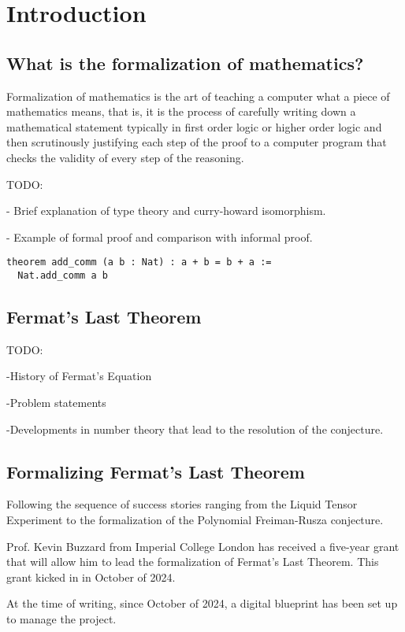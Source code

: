 \chapter{Introduction}\label{Ch1_Introduction}

\section{What is the formalization of mathematics?}

Formalization of mathematics is the art of teaching a computer what a piece of mathematics means, that is, it is the process of carefully writing down a mathematical statement typically in first order logic or higher order logic and then scrutinously justifying each step of the proof to a computer program that checks the validity of every step of the reasoning. 

TODO:

- Brief explanation of type theory and curry-howard isomorphism.

- Example of formal proof and comparison with informal proof.


\begin{verbatim}
theorem add_comm (a b : Nat) : a + b = b + a :=
  Nat.add_comm a b
\end{verbatim}


\section{Fermat's Last Theorem}

TODO:

-History of Fermat's Equation

-Problem statements

-Developments in number theory that lead to the resolution of the conjecture.


\section{Formalizing Fermat's Last Theorem}

Following the sequence of success stories ranging from the Liquid Tensor Experiment to the formalization of the Polynomial Freiman-Rusza conjecture. 

Prof. Kevin Buzzard from Imperial College London has received a five-year grant that will allow him to lead the formalization of Fermat's Last Theorem. This grant kicked in in October of 2024. 

At the time of writing, since October of 2024, a digital blueprint has been set up to manage the project.

